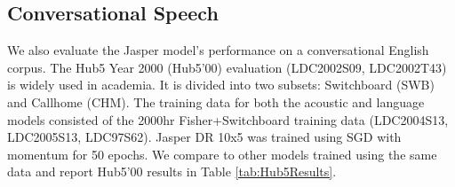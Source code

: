 \documentclass[a4paper]{article}
\begin{document}
\subsection{Conversational Speech}
We also evaluate the Jasper model's performance on a conversational English corpus. The Hub5 Year 2000 (Hub5'00) evaluation (LDC2002S09, LDC2002T43) is widely used in academia. It is divided into two subsets: Switchboard (SWB) and Callhome (CHM). The training data for both the acoustic and language models consisted of the 2000hr Fisher+Switchboard training data (LDC2004S13, LDC2005S13, LDC97S62). Jasper DR 10x5 was trained using SGD with momentum for 50 epochs. We compare to other models trained using the same data and report Hub5'00 results in Table \ref{tab:Hub5Results}.

\begin{table}[!h]
\centering
\caption{Hub5'00, WER (\%)}
\label{tab:Hub5Results}
\end{table}
\end{document}
